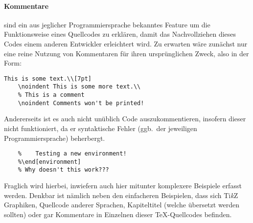




\paragraph*{Kommentare}%
sind ein aus jeglicher Programmiersprache bekanntes Feature um die Funktionsweise eines Quellcodes zu erklären, damit das Nachvollziehen dieses Codes einem anderen Entwickler erleichtert wird. Zu erwarten wäre zunächst nur eine reine Nutzung von Kommentaren für ihren ursprünglichen Zweck, also in der Form: 
\begin{Verbatim}[breaklines=true, breakanywhere=true]
    This is some text.\\[7pt]
    \noindent This is some more text.\\
    % This is a comment
    \noindent Comments won't be printed!
\end{Verbatim}
Andererseits ist es auch nicht unüblich Code auszukommentieren, insofern dieser nicht funktioniert, da er syntaktische Fehler (ggb.\ der jeweiligen Programmiersprache) beherbergt. 
\begin{Verbatim}[breaklines=true, breakanywhere=true]
    %\begin[environment]
    %    Testing a new environment!
    %\end[environment]
    % Why doesn't this work???
\end{Verbatim}
Fraglich wird hierbei, inwiefern auch hier mitunter komplexere Beispiele erfasst werden. Denkbar ist nämlich neben den einfacheren Beispielen, dass sich Ti\textit{k}Z Graphiken, Quellcode anderer Sprachen, Kapiteltitel (welche übersetzt werden sollten) oder gar Kommentare in Einzelnen dieser \TeX{}-Quellcodes befinden.

